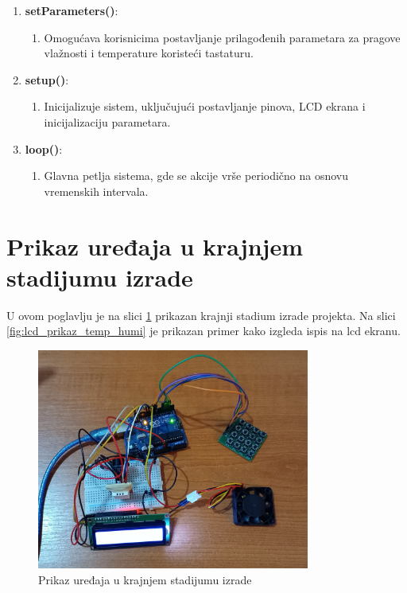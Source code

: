 \documentclass[a4paper, 12pt]{article}
\begin{document}
\begin{enumerate}[label=\arabic*.,leftmargin=*]
    \item \textbf{setParameters()}:
        \begin{enumerate}[label={},leftmargin=*] 
            \item Omogućava korisnicima postavljanje prilagođenih parametara za pragove vlažnosti i temperature koristeći tastaturu.
        \end{enumerate}
        
    \item \textbf{setup()}:
        \begin{enumerate}[label={},leftmargin=*]
        		\sloppypar
            \item Inicijalizuje sistem, uključujući postavljanje pinova, LCD ekrana i inicijalizaciju parametara.
        \end{enumerate}
        
    \item \textbf{loop()}:
        \begin{enumerate}[label={},leftmargin=*] 
            \item Glavna petlja sistema, gde se akcije vrše periodično na osnovu vremenskih intervala.
        \end{enumerate}
\end{enumerate}

\pagebreak
\endgroup

\begingroup
\justifying
\section{Prikaz uređaja u krajnjem stadijumu izrade}

\vspace{10pt}

U ovom poglavlju je na slici \ref{fig:krajnji_prikaz} prikazan krajnji stadium izrade projekta. Na slici \ref{fig:lcd_prikaz_temp_humi} je prikazan primer kako izgleda ispis na lcd ekranu.

\vspace{10pt}

\begin{figure}[H]
\centering
\includegraphics[width=0.8\textwidth]{images/krajnji_prikaz}
\caption{Prikaz uređaja u krajnjem stadijumu izrade}\label{fig:krajnji_prikaz}
\end{figure}
\end{document}
